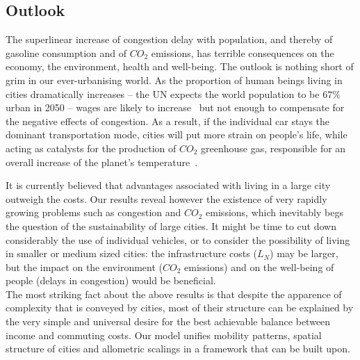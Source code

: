 \subsection{Outlook}

The superlinear increase of congestion delay with population, and thereby of
gasoline consumption and of $CO_2$ emissions, has terrible consequences on the
economy, the environment, health and well-being. The outlook is nothing short of
grim in our ever-urbanising world. As the proportion of human beings living in
cities dramatically increases -- the UN expects the world population to be $67\%$
urban in 2050 -- wages are likely to 
increase~\cite{Bettencourt:2007} but not enough to compensate for the negative
effects of congestion. As a result, if the individual car stays the dominant
transportation mode, cities will put more strain on people's life, while acting
as catalysts for the production of $CO_2$ greenhouse gas, responsible for an
overall increase of the planet's temperature~\cite{Oreskes:2004}. 

It is currently believed that advantages associated with living in a large city
outweigh the costs. Our results reveal however the existence of very rapidly
growing problems such as congestion and $CO_2$ emissions, which inevitably begs
the question of the sustainability of large cities. It might be time to cut down
considerably the use of individual vehicles, or to consider the possibility of
living in smaller or medium sized cities: the infrastructure costs ($L_N$) may
be larger, but the impact on the environment ($CO_2$ emissions) and on the
well-being of people (delays in congestion) would be beneficial.\\

The most striking fact about the above results is that despite the apparence of
complexity that is conveyed by cities, most of their structure can be explained
by the very simple and universal desire for the best achievable balance between
income and commuting costs. Our model unifies mobility patterns, spatial
structure of cities and allometric scalings in a framework that can be built
upon. 

